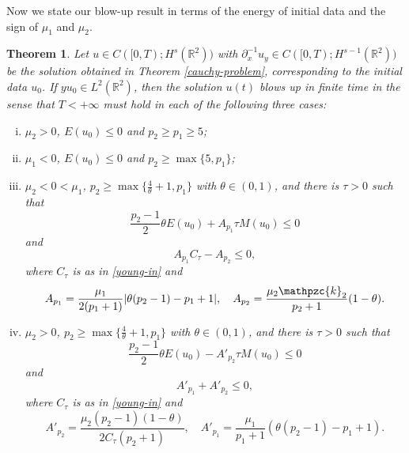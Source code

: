 \documentclass[10pt]{article}
\numberwithin{equation}{section}
\newtheorem{theorem}{\quad Theorem}[section]
\newcommand{\ps}{\mathpzc{k}}
\newcommand{\lt}{{L^2(\mathbb{R}^2)}}
\newcommand{\nd}{{\partial_x^{-1}}}
\newcommand{\mo}{\mu_1}  \newcommand{\po}{{p_1}}
\newcommand{\moo}{\mu_2}  \newcommand{\poo}{{p_2}}
\newcommand{\rt}{{\mathbb{R}^2}}
\begin{document}
	
	Now we state our blow-up result in terms of the energy of initial data and the sign of $\mu_1$ and $\mu_2$.
	\begin{theorem}\label{blow-up-theorem-1}
		Let  $u\in C([0,T);H^s(\rt))$ with $\nd u_y\in C([0,T);H^{s-1}(\rt))$ be the solution obtained in Theorem \ref{cauchy-problem}, corresponding to the initial data $u_0$. If $yu_0\in\lt$, then the solution $u(t)$ blows up in finite time  	in the sense that $T<+ \infty$ must hold in each of the following three cases:
		\begin{enumerate}[(i)]
			\item $\moo>0$, $E(u_0)\leq0$ and $p_2\geq p_1\geq5$;
			\item $\mo<0$, $E(u_0)\leq0$  and $p_2\geq \max\{5, p_1\}$;
			\item $\moo<0<\mo$, $p_2\geq\max\{\frac{4}{\theta}+1,\po\}$ with  $\theta\in(0,1)$, and there is $\tau>0$ such that
			\begin{equation}\label{blow-up-cond}
				\frac{\poo-1}{2}\theta E(u_0) 
				+A_{\po}\tau M(u_0)\leq0 
			\end{equation}
			and 
			\[
			A_{\po}C_\tau- A_\poo\leq0,
			\]
			where $C_\tau$ is as in \eqref{young-in} and
			\[
			A_{\po}=\frac{\mo}{2(\po+1)} |\theta(\poo-1)-\po+1|,\quad A_{\poo}=\frac{\moo\ps_2}{\poo+1}(1-\theta).
			\]
			
			\item $\moo>0$, $p_2\geq\max\{\frac{4}{\theta}+1,\po\}$ with  $\theta\in(0,1)$, and there is $\tau>0$ such that
			\begin{equation}\label{blow-up-cond-1}
				\frac{\poo-1}{2}\theta E(u_0) 
				-A'_{\poo}\tau M(u_0)\leq0 
			\end{equation}
			and 
			\[
			A'_{\po}+ A'_\poo\leq0,
			\]
			where $C_\tau$ is as in \eqref{young-in} and
			\[
			A'_{\poo}=\frac{\moo (p_2-1)(1-\theta)}{2C_\tau(\poo+1)} ,\quad 
			A'_{\po }=\frac{\mo}{\po +1}( \theta(p_2-1)-p_1+1).
			\]
		\end{enumerate}
	\end{theorem} 
\end{document}
